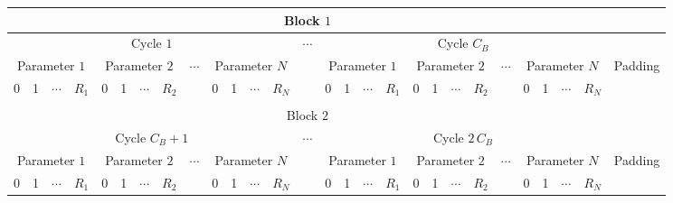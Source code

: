 \documentclass{standalone}
\begin{document}
	\begin{tabular}{@{}|c|c|c|c|c|c|c|c|c|c|c|c|c|c|c|c|c|c|c|c|c|c|c|c|c|c|c|c|@{}}
		\hline
			\multicolumn{27}{|c}{Block \(1\)} & \\
		\hline
			\multicolumn{13}{|c|}{Cycle \(1\)} &
			\multirow{3}{*}{\(\cdots\)} &
			\multicolumn{13}{|c|}{Cycle \(C_B\)} & \\
		\cline{1-13}
		\cline{15-27}
			\multicolumn{4}{|c|}{Parameter \(1\)} &
			\multicolumn{4}{|c|}{Parameter \(2\)} &
			\multirow{2}{*}{\(\cdots\)} &
			\multicolumn{4}{|c|}{Parameter \(N\)} &
			&
			\multicolumn{4}{|c|}{Parameter \(1\)} &
			\multicolumn{4}{|c|}{Parameter \(2\)} &
			\multirow{2}{*}{\(\cdots\)} &
			\multicolumn{4}{|c|}{Parameter \(N\)} &
			\multirow{2}{*}{Padding} \\
		\cline{1-8}
		\cline{10-13}
		\cline{15-22}
		\cline{24-27}
			0 & 1 & \(\cdots\) & \(R_1\) &
			0 & 1 & \(\cdots\) & \(R_2\) & &
			0 & 1 & \(\cdots\) & \(R_N\) &
			&
			0 & 1 & \(\cdots\) & \(R_1\) &
			0 & 1 & \(\cdots\) & \(R_2\) & &
			0 & 1 & \(\cdots\) & \(R_N\) & \\
		\hline
		\multicolumn{8}{c}{\raisebox{1em}{}} \\
		\hline
			\multicolumn{27}{|c}{Block \(2\)} & \\
		\hline
			\multicolumn{13}{|c|}{Cycle \(C_B+1\)} &
			\multirow{3}{*}{\(\cdots\)} &
			\multicolumn{13}{|c|}{Cycle \(2 \, C_B\)} & \\
		\cline{1-13}
		\cline{15-27}
			\multicolumn{4}{|c|}{Parameter \(1\)} &
			\multicolumn{4}{|c|}{Parameter \(2\)} &
			\multirow{2}{*}{\(\cdots\)} &
			\multicolumn{4}{|c|}{Parameter \(N\)} &
			&
			\multicolumn{4}{|c|}{Parameter \(1\)} &
			\multicolumn{4}{|c|}{Parameter \(2\)} &
			\multirow{2}{*}{\(\cdots\)} &
			\multicolumn{4}{|c|}{Parameter \(N\)} &
			\multirow{2}{*}{Padding} \\
		\cline{1-8}
		\cline{10-13}
		\cline{15-22}
		\cline{24-27}
			0 & 1 & \(\cdots\) & \(R_1\) &
			0 & 1 & \(\cdots\) & \(R_2\) & &
			0 & 1 & \(\cdots\) & \(R_N\) &
			&
			0 & 1 & \(\cdots\) & \(R_1\) &
			0 & 1 & \(\cdots\) & \(R_2\) & &
			0 & 1 & \(\cdots\) & \(R_N\) & \\
		\hline

\end{tabular}
\end{document}

